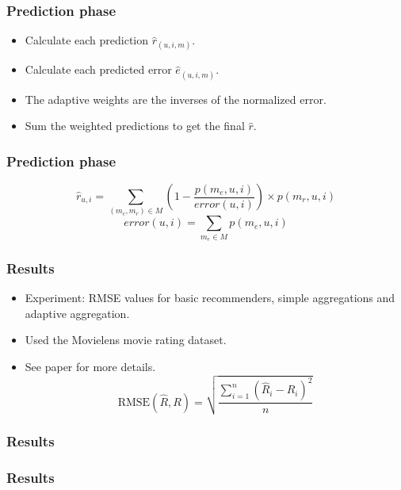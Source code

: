 \documentclass[screen]{beamer}
\begin{document}
\begin{frame}
  \frametitle{Prediction phase}
  
  \begin{itemize}
    \item Calculate each prediction $\hat{r}_{(u,i,m)}$.
    \item Calculate each predicted error $\hat{e}_{(u,i,m)}$.
    \item The adaptive weights are the inverses of the normalized error.
    \item Sum the weighted predictions to get the final $\hat{r}$.
  \end{itemize}  
\end{frame}

\begin{frame}
  \frametitle{Prediction phase}
  \begin{equation}
    \label{eq:adaptive}
    \hat{r}_{u,i} = \sum_{(m_{e}, m_{r}) \in M} (1 - 
    \frac{
      p(m_{e},u,i)
    }{
      error(u,i)
    }) \times p(m_{r},u,i)
  \end{equation}
  \vspace{2em}
  \begin{equation}
    error(u,i) = \sum_{m_e \in M} p(m_e,u,i)     
  \end{equation}
\end{frame}

\begin{frame}
  \frametitle{Results}
  \begin{itemize}
    \item Experiment: RMSE values for basic recommenders, simple aggregations and adaptive aggregation.
    \item Used the Movielens movie rating dataset.
    \item See paper for more details.
    \vspace{2em}
    \begin{equation}
      \mathrm{RMSE}(\hat{R},R)
      = \sqrt{\frac{
          \sum_{i=1}^{n} (\hat{R}_i - R_i)^2
        }{
          n
        }}
    \end{equation}
  \end{itemize}
\end{frame}

\begin{frame}
  \frametitle{Results}
  
\end{frame}

\begin{frame}
  \frametitle{Results}
  
\end{frame}
\end{document}
